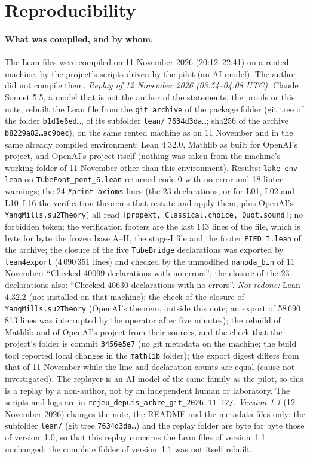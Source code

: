 \documentclass[11pt,a4paper]{article}
\theoremstyle{plain}
\theoremstyle{definition}
\theoremstyle{remark}
\numberwithin{equation}{section}
\begin{document}
\section{Reproducibility}\label{sec:repro}
\paragraph{What was compiled, and by whom.} The Lean files were compiled on 11 November 2026 (20:12--22:41) on a rented machine, by the project's scripts driven by the pilot (an AI model). The author did not compile them. \emph{Replay of 12 November 2026 (03:54--04:08 UTC).} Claude Sonnet 5.5, a model that is not the author of the statements, the proofs or this note, rebuilt the Lean file from the \texttt{git archive} of the package folder (git tree of the folder \texttt{b1d1e6ed\dots}, of its subfolder \texttt{lean/} \texttt{7634d3da\dots}; sha256 of the archive \texttt{b8229a82\dots ac9bec}), on the same rented machine as on 11 November and in the same already compiled environment: Lean 4.32.0, Mathlib as built for OpenAI's project, and OpenAI's project itself (nothing was taken from the machine's working folder of 11 November other than this environment). Results: \texttt{lake env lean} on \texttt{TubePont\_pont\_6.lean} returned code 0 with no error and 18 linter warnings; the 24 \texttt{\#print axioms} lines (the 23 declarations, or for L01, L02 and L10--L16 the verification theorems that restate and apply them, plus OpenAI's \texttt{YangMills.su2Theory}) all read \texttt{[propext, Classical.choice, Quot.sound]}; no forbidden token; the verification footers are the last 143 lines of the file, which is byte for byte the frozen base A--H, the stage-I file and the footer \texttt{PIED\_I.lean} of the archive; the closure of the five \texttt{TubeBridge} declarations was exported by \texttt{lean4export} (4\,090\,351 lines) and checked by the unmodified \texttt{nanoda\_bin} of 11 November: ``Checked 40099 declarations with no errors''; the closure of the 23 declarations also: ``Checked 40630 declarations with no errors''. \emph{Not redone:} Lean 4.32.2 (not installed on that machine); the check of the closure of \texttt{YangMills.su2Theory} (OpenAI's theorem, outside this note; an export of 58\,690\,813 lines was interrupted by the operator after five minutes); the rebuild of Mathlib and of OpenAI's project from their sources, and the check that the project's folder is commit \texttt{3456e5e7} (no git metadata on the machine; the build tool reported local changes in the \texttt{mathlib} folder); the export digest differs from that of 11 November while the line and declaration counts are equal (cause not investigated). The replayer is an AI model of the same family as the pilot, so this is a replay by a non-author, not by an independent human or laboratory. The scripts and logs are in \texttt{rejeu\_depuis\_arbre\_git\_2026-11-12/}. \emph{Version 1.1} (12 November 2026) changes the note, the README and the metadata files only: the subfolder \texttt{lean/} (git tree \texttt{7634d3da\dots}) and the replay folder are byte for byte those of version~1.0, so that this replay concerns the Lean files of version~1.1 unchanged; the complete folder of version~1.1 was not itself rebuilt.
\end{document}
